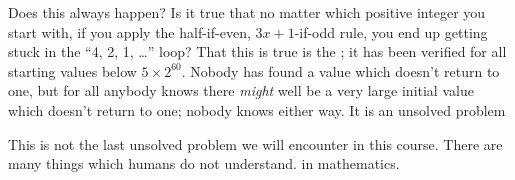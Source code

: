 \documentclass{ximera}
\begin{document}
Does this always happen?  Is it true that no matter which positive
integer you start with, if you apply the half-if-even, $3x+1$-if-odd
rule, you end up getting stuck in the ``4, 2, 1, \ldots'' loop?  That
this is true is the ; it has been
verified for all starting values below $5 \times 2^{60}$.  Nobody has
found a value which doesn't return to one, but for all anybody knows
there \textit{might} well be a very large initial value which doesn't
return to one; nobody knows either way.  It is an unsolved
problem


This is not the last unsolved problem we will
  encounter in this course.  There are many things which humans do not
  understand. in mathematics.
\end{document}
